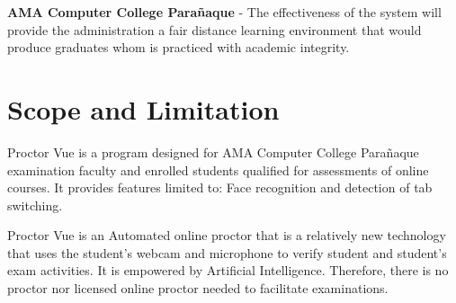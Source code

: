 \textbf{AMA Computer College Parañaque} - The effectiveness of the system will provide the administration a fair distance learning environment that would produce graduates whom is practiced with academic integrity.

\section{Scope and Limitation}

Proctor Vue is a program designed for AMA Computer College Parañaque examination faculty and enrolled students qualified for assessments of online courses.
It provides features limited to: Face recognition and detection of tab switching.

Proctor Vue is an Automated online proctor that is a relatively new technology that uses the student’s webcam and microphone to verify student and student’s exam activities.
It is empowered by Artificial Intelligence.
Therefore, there is no proctor nor licensed online proctor needed to facilitate examinations.

